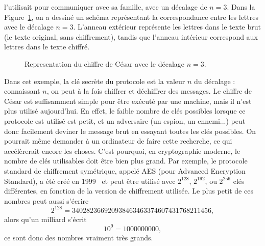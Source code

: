 l'utilisait pour communiquer avec sa famille, avec un décalage de $n=3$. Dans la
Figure~\ref{fig:caesar}, on a dessiné un schéma représentant la correspondance
entre les lettres avec le décalage $n=3$. L'anneau extérieur représente les
lettres dans le texte brut (le texte original, sans chiffrement), tandis que
l'anneau intérieur correspond aux lettres dans le texte chiffré.
\begin{figure}
  \centering
  \caption{Representation du chiffre de César avec le décalage $n=3$.}
  \label{fig:caesar}
\end{figure}
Dans cet exemple, la clé secrète du protocole est la valeur $n$ du décalage :
connaissant $n$, on peut à la fois chiffrer et déchiffrer des messages. Le
chiffre de César est suffisamment simple pour être exécuté par une machine, mais
il n'est plus utilisé aujourd'hui. En effet, le faible nombre de clés possibles
lorsque ce protocole est utilisé est petit, et un adversaire (un espion, un
ennemi...) peut donc facilement deviner le message brut en essayant toutes les
clés possibles. On pourrait même demander à un ordinateur de faire cette
recherche, ce qui accélèrerait encore les choses. C'est pourquoi, en
cryptographie moderne, le nombre de clés utilisables doit être bien plus grand.
Par exemple, le protocole standard de chiffrement symétrique, appelé AES (pour
Advanced Encryption Standard), a été créé en 1999~\cite{DR99, DR02} et peut être
utilisé avec $2^{128}$, $2^{192}$, ou $2^{256}$ clés différentes, en fonction de
la version de chiffrement utilisée. Le plus petit de ces nombres peut aussi
s'écrire
\[
  2^{128} = 340282366920938463463374607431768211456,
\]
alors qu'un milliard s'écrit
\[
  10^{9} = 1000000000,
\]
ce sont donc des nombres vraiment très grands.


